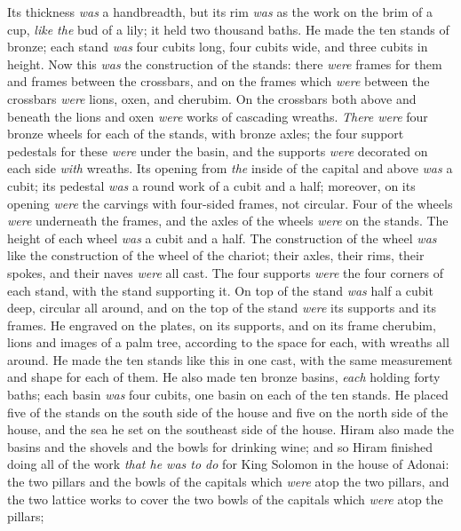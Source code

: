 \begin{biblechapter}
\verse Its thickness \textit{was} a handbreadth, but its rim \textit{was} as the work on the brim of a cup, \textit{like the} bud of a lily; it held two thousand baths.
\verse He made the ten stands of bronze; each stand \textit{was} four cubits long, four cubits wide, and three cubits in height.
\verse Now this \textit{was} the construction of the stands: there \textit{were} frames for them and frames between the crossbars,
\verse and on the frames which \textit{were} between the crossbars \textit{were} lions, oxen, and cherubim. On the crossbars both above and beneath the lions and oxen \textit{were} works of cascading wreaths.
\verse \textit{There were} four bronze wheels for each of the stands, with bronze axles; the four support pedestals for these \textit{were} under the basin, and the supports \textit{were} decorated on each side \textit{with} wreaths.
\verse Its opening from \textit{the} inside of the capital and above \textit{was} a cubit; its pedestal \textit{was} a round work of a cubit and a half; moreover, on its opening \textit{were} the carvings with four-sided frames, not circular.
\verse Four of the wheels \textit{were} underneath the frames, and the axles of the wheels \textit{were} on the stands. The height of each wheel \textit{was} a cubit and a half.
\verse The construction of the wheel \textit{was} like the construction of the wheel of the chariot; their axles, their rims, their spokes, and their naves \textit{were} all cast.
\verse The four supports \textit{were} the four corners of each stand, with the stand supporting it.
\verse On top of the stand \textit{was} half a cubit deep, circular all around, and on the top of the stand \textit{were} its supports and its frames.
\verse He engraved on the plates, on its supports, and on its frame cherubim, lions and images of a palm tree, according to the space for each, with wreaths all around.
\verse He made the ten stands like this in one cast, with the same measurement and shape for each of them.
\verse He also made ten bronze basins, \textit{each} holding forty baths; each basin \textit{was} four cubits, one basin on each of the ten stands.
\verse He placed five of the stands on the south side of the house and five on the north side of the house, and the sea he set on the southeast side of the house.
\verse Hiram also made the basins and the shovels and the bowls for drinking wine; and so Hiram finished doing all of the work \textit{that he was to do} for King Solomon in the house of Adonai:
\verse the two pillars and the bowls of the capitals which \textit{were} atop the two pillars, and the two lattice works to cover the two bowls of the capitals which \textit{were} atop the pillars;

\end{biblechapter}
